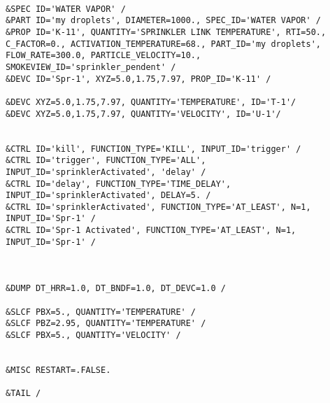 \begin{lstlisting}[emptylines=0,basicstyle=\tiny]
 
&SPEC ID='WATER VAPOR' /
&PART ID='my droplets', DIAMETER=1000., SPEC_ID='WATER VAPOR' /
&PROP ID='K-11', QUANTITY='SPRINKLER LINK TEMPERATURE', RTI=50., C_FACTOR=0., ACTIVATION_TEMPERATURE=68., PART_ID='my droplets', FLOW_RATE=300.0, PARTICLE_VELOCITY=10., SMOKEVIEW_ID='sprinkler_pendent' /
&DEVC ID='Spr-1', XYZ=5.0,1.75,7.97, PROP_ID='K-11' /

&DEVC XYZ=5.0,1.75,7.97, QUANTITY='TEMPERATURE', ID='T-1'/
&DEVC XYZ=5.0,1.75,7.97, QUANTITY='VELOCITY', ID='U-1'/


&CTRL ID='kill', FUNCTION_TYPE='KILL', INPUT_ID='trigger' /
&CTRL ID='trigger', FUNCTION_TYPE='ALL', INPUT_ID='sprinklerActivated', 'delay' /
&CTRL ID='delay', FUNCTION_TYPE='TIME_DELAY', INPUT_ID='sprinklerActivated', DELAY=5. /
&CTRL ID='sprinklerActivated', FUNCTION_TYPE='AT_LEAST', N=1, INPUT_ID='Spr-1' /
&CTRL ID='Spr-1 Activated', FUNCTION_TYPE='AT_LEAST', N=1, INPUT_ID='Spr-1' /



&DUMP DT_HRR=1.0, DT_BNDF=1.0, DT_DEVC=1.0 /

&SLCF PBX=5., QUANTITY='TEMPERATURE' /
&SLCF PBZ=2.95, QUANTITY='TEMPERATURE' /
&SLCF PBX=5., QUANTITY='VELOCITY' /


&MISC RESTART=.FALSE.

&TAIL /

    
\end{lstlisting}
